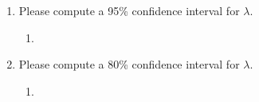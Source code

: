 \documentclass[krantz1,ChapterTOCs]{krantz}
\begin{document}
\begin{enumerate}
\begin{enumerate}
\begin{enumerate}
{            } 
        \end{enumerate}

            \item Please compute a 95\% confidence interval for $\lambda$.
        \begin{enumerate}
            \item {
            \color{red} 
        
            } 
        \end{enumerate}

            \item Please compute a 80\% confidence interval for $\lambda$.
                \begin{enumerate}
            \item {
            \color{red} 
        
            } 
        \end{enumerate}

        \end{enumerate}

\end{enumerate}
\end{document}
